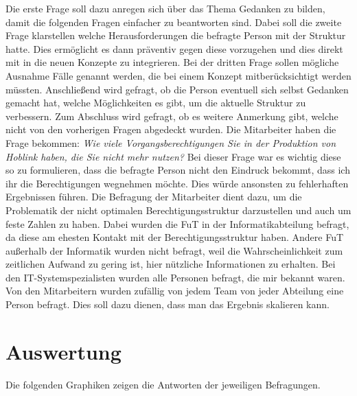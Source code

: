 Die erste Frage soll dazu anregen sich über das Thema Gedanken zu bilden, damit die folgenden Fragen einfacher zu beantworten sind.
Dabei soll die zweite Frage klarstellen welche Herausforderungen die befragte Person mit der Struktur hatte.
Dies ermöglicht es dann präventiv gegen diese vorzugehen und dies direkt mit in die neuen Konzepte zu integrieren.
Bei der dritten Frage sollen mögliche Ausnahme Fälle genannt werden, die bei einem Konzept mitberücksichtigt werden müssten.
Anschließend wird gefragt, ob die Person eventuell sich selbst Gedanken gemacht hat, welche Möglichkeiten es gibt, um die aktuelle Struktur zu verbessern.
Zum Abschluss wird gefragt, ob es weitere Anmerkung gibt, welche nicht von den vorherigen Fragen abgedeckt wurden.
\newline
\newline
Die Mitarbeiter haben die Frage bekommen:
\newline
\newline
\textit{Wie viele Vorgangsberechtigungen Sie in der Produktion von Hoblink haben, die Sie nicht mehr nutzen?}
\newline
\newline
Bei dieser Frage war es wichtig diese so zu formulieren, dass die befragte Person nicht den Eindruck bekommt, dass ich ihr die Berechtigungen wegnehmen möchte.
Dies würde ansonsten zu fehlerhaften Ergebnissen führen.
Die Befragung der Mitarbeiter dient dazu, um die Problematik der nicht optimalen Berechtigungsstruktur darzustellen und auch um feste Zahlen zu haben.
\newline
\newline
Dabei wurden die \ac{FuT} in der Informatikabteilung befragt, da diese am ehesten Kontakt mit der Berechtigungsstruktur haben.
Andere \ac{FuT} außerhalb der Informatik wurden nicht befragt, weil die Wahrscheinlichkeit zum zeitlichen Aufwand zu gering ist, hier nützliche Informationen zu erhalten.
Bei den IT-Systemspezialisten wurden alle Personen befragt, die mir bekannt waren.
Von den Mitarbeitern wurden zufällig von jedem Team von jeder Abteilung eine Person befragt.
Dies soll dazu dienen, dass man das Ergebnis skalieren kann.
\newpage
\section{Auswertung}
\label{sec:Auswertung}

Die folgenden Graphiken zeigen die Antworten der jeweiligen Befragungen.

